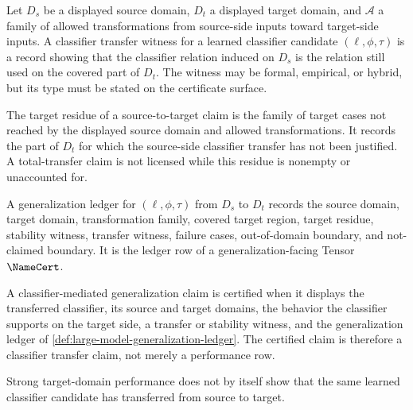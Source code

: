 \begin{definition}
\label{def:large-model-classifier-transfer-witness}
Let $D_s$ be a displayed source domain, $D_t$ a displayed target domain,
and $\mathcal{A}$ a family of allowed transformations from source-side
inputs toward target-side inputs. A classifier transfer witness for a
learned classifier candidate $(\ell,\phi,\tau)$ is a record showing that
the classifier relation induced on $D_s$ is the relation still used on
the covered part of $D_t$. The witness may be formal, empirical, or
hybrid, but its type must be stated on the certificate surface.
\end{definition}

\begin{definition}
\label{def:large-model-generalization-residue}
The target residue of a source-to-target claim is the family of target
cases not reached by the displayed source domain and allowed
transformations. It records the part of $D_t$ for which the source-side
classifier transfer has not been justified. A total-transfer claim is
not licensed while this residue is nonempty or unaccounted for.
\end{definition}

\begin{definition}
\label{def:large-model-generalization-ledger}
A generalization ledger for $(\ell,\phi,\tau)$ from $D_s$ to $D_t$
records the source domain, target domain, transformation family, covered
target region, target residue, stability witness, transfer witness,
failure cases, out-of-domain boundary, and not-claimed boundary. It is
the ledger row of a generalization-facing Tensor $\NameCert$.
\end{definition}

\begin{definition}
\label{def:large-model-certified-classifier-mediated-generalization}
A classifier-mediated generalization claim is certified when it displays
the transferred classifier, its source and target domains, the behavior
the classifier supports on the target side, a transfer or stability
witness, and the generalization ledger of
\autoref{def:large-model-generalization-ledger}. The certified claim is
therefore a classifier transfer claim, not merely a performance row.
\end{definition}

\begin{theorem}
\label{thm:large-model-performance-not-classifier-transfer}
Strong target-domain performance does not by itself show that the same
learned classifier candidate has transferred from source to target.
\end{theorem}

